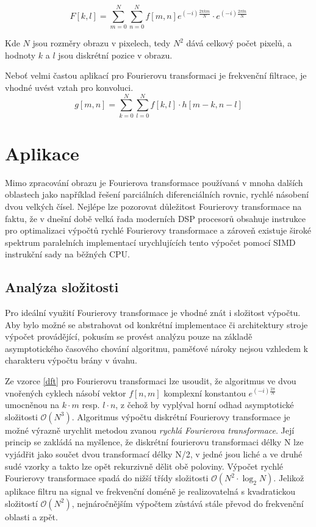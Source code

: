 \documentclass[11pt,a4paper]{article}
\begin{document}
\begin{equation}
F[k,l] = \sum_{m=0}^{N}{\sum_{n=0}^{N}{f[m,n]e^{(-i)\frac{2\pi km}{N}}\cdot e^{(-i)\frac{2\pi ln}{N}}}}
\label{dft}
\end{equation}

Kde $N$ jsou rozměry obrazu v pixelech, tedy $N^2$ dává celkový počet pixelů, a hodnoty $k$ a $l$ 
jsou diskrétní pozice v obrazu. 

Neboť velmi častou aplikací pro Fourierovu transformaci je frekvenční filtrace, je vhodné uvést vztah 
pro konvoluci.
\begin{equation}
g[m,n] = \sum_{k=0}^{N}{\sum_{l=0}^{N}{f[k,l]\cdot h[m-k, n-l]}}
\label{konvoluce}
\end{equation}


\section{Aplikace}
Mimo zpracování obrazu je Fourierova transformace používaná v mnoha dalších oblastech jako například
řešení parciálních diferenciálních rovnic, rychlé násobení dvou velkých čísel. Nejlépe lze pozorovat
důležitost Fourierovy transformace na faktu, že v dnešní době velká řada moderních DSP procesorů obsahuje
instrukce pro optimalizaci výpočtů rychlé Fourierovy transformace a zároveň existuje široké spektrum
paralelních implementací urychlujících tento výpočet pomocí SIMD instrukční sady na běžných CPU.

\subsection{Analýza složitosti}
Pro ideální využití Fourierovy transformace je vhodné znát i složitost výpočtu. Aby bylo  možné se
abstrahovat od konkrétní implementace či architektury stroje výpočet provádějící, 
pokusím se provést analýzu pouze na základě asymptotického časového chování algoritmu, paměťové
nároky nejsou vzhledem k charakteru výpočtu brány v úvahu.

Ze vzorce \ref{dft} pro Fourierovu transformaci lze usoudit, že algoritmus ve dvou vnořených cyklech
násobí vektor $f[n,m]$ komplexní konstantou $e^{(-i)\frac{2\pi}{N}}$ umocněnou na $k\cdot m$ resp.
$l\cdot n$, z čehož by vyplýval horní odhad asymptotické složitosti $\mathcal{O}(N^3)$. 
Algoritmus výpočtu diskrétní Fourierovy transformace je možné výrazně urychlit metodou zvanou 
\textit{rychlá Fourierova transformace}. Její princip se zakládá na myšlence, že diskrétní fourierovu
transformaci délky N lze vyjádřit jako součet dvou transformací délky N/2, v jedné jsou liché a ve
druhé sudé vzorky a takto lze opět rekurzivně dělit obě poloviny. Výpočet rychlé Fourierovy transformace
spadá do nižší třídy složitosti $\mathcal{O}(N^2 \cdot \log_{2}{N})$. Jelikož aplikace filtru na signal ve
frekvenční doméně je realizovatelná s kvadratickou složitostí $\mathcal{O}(N^2)$, nejnáročnějším výpočtem
zůstává stále převod do frekvenční oblasti a zpět.
\end{document}
